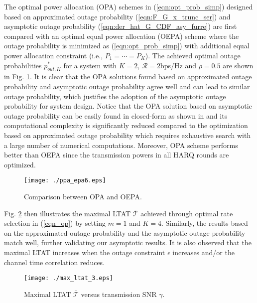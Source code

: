 \documentclass[12pt,onecolumn,draftcls]{IEEEtran}
\begin{document}
The optimal power allocation (OPA) schemes in (\ref{eqn:opt_prob_simp}) designed based on approximated outage probability (\ref{eqn:F_G_x_trunc_ser}) and asymptotic outage probability (\ref{eqn:der_hat_G_CDF_asy_furre}) are first compared with an optimal equal power allocation (OEPA) scheme where the outage probability is minimized as (\ref{eqn:opt_prob_simp}) with additional equal power allocation constraint (i.e., $P_1=\cdots=P_K$). The achieved optimal outage probabilities $p_{out,K}^*$ for a system with $K=2$, $\mathcal R=2$bps/Hz and $\rho=0.5$ are shown in Fig. \ref{fig:ppa_epa_comp}. It is clear that the OPA solutions found based on approximated outage probability and asymptotic outage probability agree well and can lead to similar outage probability, which justifies the adoption of the asymptotic outage probability for system design. Notice that the OPA solution based on asymptotic outage probability can be easily found in closed-form as shown in \cite{chaitanya2016energy} and its computational complexity is significantly reduced compared to the optimization based on approximated outage probability which requires exhaustive search with a large number of numerical computations. Moreover, OPA scheme performs better than OEPA since the transmission powers in all HARQ rounds are optimized.

\begin{figure}
  \centering
  \texttt{[image: ./ppa\_epa6.eps]}\\
  \caption{Comparison between OPA and OEPA.}\label{fig:ppa_epa_comp}
\end{figure}

Fig. \ref{fig:opt_rate} then illustrates the maximal LTAT $\bar {\mathcal T}$ achieved through optimal rate selection in (\ref{eqn_op}) by setting $m=1$ and $K=4$. Similarly, the results based on the approximated outage probability and the asymptotic outage probability match well, further validating our asymptotic results. It is also observed that the maximal LTAT increases when the outage constraint $\epsilon $ increases and/or the channel time correlation reduces.
\begin{figure}
  \centering
  \texttt{[image: ./max\_ltat\_3.eps]}\\
  \caption{Maximal LTAT $\bar {\mathcal T}$ versus transmission SNR $\gamma$.}\label{fig:opt_rate}
\end{figure}
\end{document}
